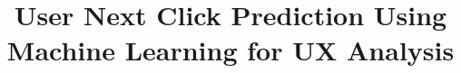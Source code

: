 \documentclass[sn-mathphys-num, Numbered]{sn-jnl}%
\theoremstyle{thmstyleone}%
\theoremstyle{thmstyletwo}%
\theoremstyle{thmstylethree}%
\begin{document}
\title[Article Title]{User Next Click Prediction Using Machine Learning for UX Analysis}



%
%
%
%
%
%

\end{document}
